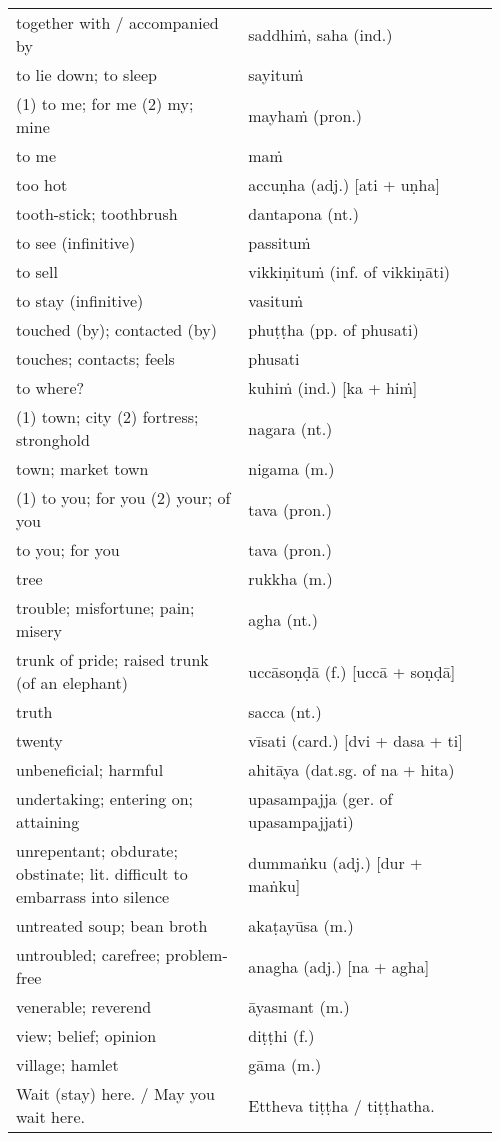 \documentclass[a5paper]{memoir}
\begin{document}
\begin{longtable}{L{0.48\linewidth} L{0.48\linewidth} H}
together with / accompanied by & saddhiṁ, saha (ind.) & \\
to lie down; to sleep & sayituṁ & \\
(1) to me; for me (2) my; mine & mayhaṁ (pron.) & \\
to me & maṁ & \\
too hot & accuṇha (adj.) [ati + uṇha] & \\
tooth-stick; toothbrush & dantapona (nt.) & \\
to see (infinitive) & passituṁ & \\
to sell & vikkiṇituṁ (inf. of vikkiṇāti) & \\
to stay (infinitive) & vasituṁ & \\
touched (by); contacted (by) & phuṭṭha (pp. of phusati) & \\
touches; contacts; feels & phusati & \\
to where? & kuhiṁ (ind.) [ka + hiṁ] & \\
(1) town; city (2) fortress; stronghold & nagara (nt.) & \\
town; market town & nigama (m.) & \\
(1) to you; for you (2) your; of you & tava (pron.) & \\
to you; for you & tava (pron.) & \\
tree & rukkha (m.) & \\
trouble; misfortune; pain; misery & agha (nt.) & \\
trunk of pride; raised trunk (of an elephant) & uccāsoṇḍā (f.) [uccā + soṇḍā] & \\
truth & sacca (nt.) & \\
twenty & vīsati (card.) [dvi + dasa + ti] & \\
unbeneficial; harmful & ahitāya (dat.sg. of na + hita) & \\
undertaking; entering on; attaining & upasampajja (ger. of upasampajjati) & \\
unrepentant; obdurate; obstinate; lit. difficult to embarrass into silence & dummaṅku (adj.) [dur + maṅku] & \\
untreated soup; bean broth & akaṭayūsa (m.) & \\
untroubled; carefree; problem-free & anagha (adj.) [na + agha] & \\
venerable; reverend & āyasmant (m.) & \\
view; belief; opinion & diṭṭhi (f.) & \\
village; hamlet & gāma (m.) & \\
Wait (stay) here. / May you wait here. & Ettheva tiṭṭha / tiṭṭhatha. & \\

\end{longtable}
\end{document}
